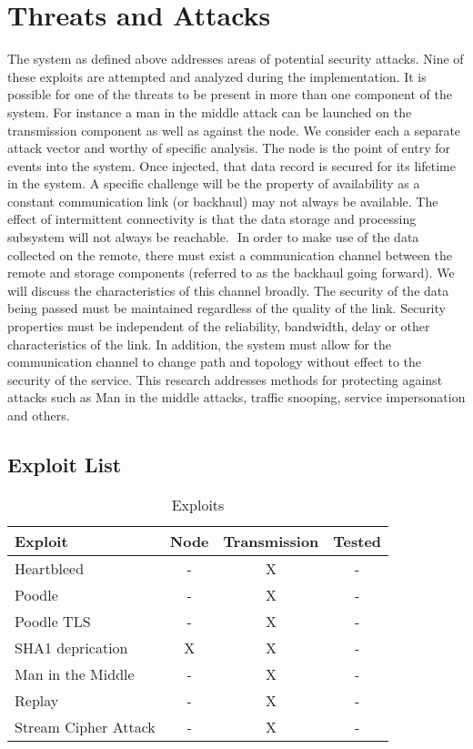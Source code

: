\chapter{Threats and Attacks}

The system as defined above addresses areas of potential security attacks. Nine of these exploits are attempted and analyzed during the implementation. It is possible for one of the threats to be present in more than one component of the system. For instance a man in the middle attack can be launched on the transmission component as well as against the node. We consider each a separate attack vector and worthy of specific analysis.
The node is the point of entry for events into the system. Once injected, that data record is secured for its lifetime in the system. A specific challenge will be the property of availability as a constant communication link (or backhaul) may not always be available. The effect of intermittent connectivity is that the data storage and processing subsystem will not always be reachable. 
 In order to make use of the data collected on the remote, there must exist a communication channel between the remote and storage components (referred to as the backhaul going forward). We will discuss the characteristics of this channel broadly. The security of the data being passed must be maintained regardless of the quality of the link. Security properties must be independent of the reliability, bandwidth, delay or other characteristics of the link. In addition, the system must allow for the communication channel to change path and topology without effect to the security of the service. This research addresses methods for protecting against attacks such as Man in the middle attacks, traffic snooping, service impersonation and others.

\section{Exploit List}

\begin{table}[ ]
\centering
\begin{tabular}{l|c|c|c}
 \bf Exploit & \bf Node & \bf Transmission & \bf Tested\\
 \hline
      Heartbleed              &  - &  X & -\\
      Poodle                  &  - &  X & -\\
      Poodle TLS              &  - &  X & -\\
      SHA1 deprication        &  X &  X & -\\
      Man in the Middle       &  - &  X & -\\
      Replay                  &  - &  X & -\\
      Stream Cipher Attack    &  - &  X & -\\
 \hline
\end{tabular}
\caption{Exploits}
\label{tab:exploits}
\end{table}

